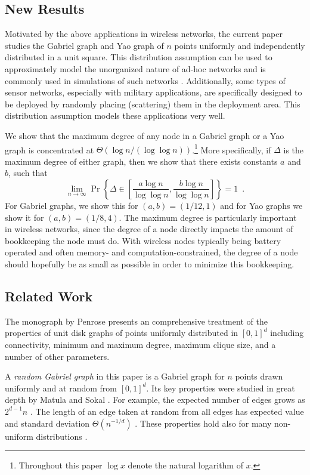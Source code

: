 \documentclass[lotsofwhite,charterfonts]{patmorin}
\newcommand{\PROB}{\Pr}
\begin{document}
\subsection{New Results}

Motivated by the above applications in wireless networks, the current paper
studies the Gabriel graph and Yao graph of $n$ points uniformly and
independently distributed in a unit square.  This distribution assumption
can be used to approximately model the unorganized nature of ad-hoc
networks and is commonly used in simulations of such networks \cite{tma09}.
Additionally, some types of sensor networks, especially with military
applications, are specifically designed to be deployed by randomly placing
(scattering) them in the deployment area. This distribution assumption
models these applications very well.

We show that the maximum degree of any node in a Gabriel
graph or a Yao graph is concentrated at $\Theta(\log n/(\log\log
n))$.\footnote{Throughout this paper $\log x$ denote the natural logarithm
of $x$.} More specifically, if $\Delta$ is the maximum degree of either
graph, then we show that there exists constants $a$ and $b$, such that
\[
    \lim_{n\rightarrow\infty}
       \PROB\left\{\Delta\in \left[\frac{a\log n}{\log\log n},
                         \frac{b\log n}{\log\log n}\right]\right\} = 1
       \enspace .
\]
For Gabriel graphs, we show this for $(a,b)=(1/12,1)$ and for Yao graphs
we show it for $(a,b)=(1/8,4)$.  The maximum degree is particularly
important in wireless networks, since the degree of a node directly impacts
the amount of bookkeeping the node must do.  With wireless nodes typically
being battery operated and often memory- and computation-constrained, the
degree of a node should hopefully be as small as possible in order to
minimize this bookkeeping.

\subsection{Related Work}

The monograph by Penrose \cite{p03} presents an comprehensive treatment of
the properties of unit disk graphs of points uniformly distributed in
$[0,1]^d$ including connectivity, minimum and maximum degree, maximum
clique size, and a number of other parameters.

A \emph{random Gabriel graph} in this paper is a Gabriel graph for $n$
points drawn uniformly and at random from $[0,1]^d$.  Its key properties
were studied in great depth by Matula and Sokal \cite{ms80}.  For example,
the expected number of edges grows as $2^{d-1} n$ \cite{d88,ms80}.  The
length of an edge taken at random from all edges has expected value and
standard deviation $\Theta(n^{-1/d})$ \cite{d88}.  These properties hold
also for many non-uniform distributions \cite{d88}.  
\end{document}
